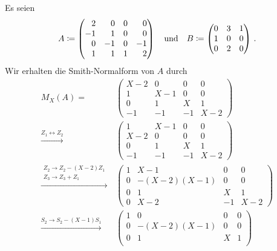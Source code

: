 Es seien
\[
            A
  \defined  \begin{pmatrix*}[r]
               2  &  0  & 0 &  0  \\
              -1  &  1  & 0 &  0  \\
               0  & -1  & 0 & -1  \\
               1  &  1  & 1 &  2
            \end{pmatrix*}
  \quad\text{und}\quad
            B
  \defined  \begin{pmatrix*}[r]
              0 & 3 & 1 \\
              1 & 0 & 0 \\
              0 & 2 & 0
            \end{pmatrix*} \,.
\]
Wir erhalten die Smith-Normalform von $A$ durch
\begin{align*}
    M_X(A)
  =&\,
    \begin{pmatrix}
      X-2 &   0 &   0 &   0 \\
        1 & X-1 &   0 &   0 \\
        0 &   1 & X   &   1 \\
       -1 &  -1 &  -1 & X-2
    \end{pmatrix}
  \\
  \xrightarrow{Z_1 \leftrightarrow Z_2}&\,
    \begin{pmatrix}
        1 & X-1 &   0 &   0 \\
      X-2 &   0 &   0 &   0 \\
        0 &   1 & X   &   1 \\
       -1 &  -1 &  -1 & X-2
    \end{pmatrix}
  \\
  \xrightarrow{\substack{Z_2 \to Z_2 - (X-2) Z_1 \\ Z_3 \to Z_3 + Z_1}}&\,
    \begin{pmatrix}
      1 &         X-1 &   0 &   0 \\
      0 & -(X-2)(X-1) &   0 &   0 \\
      0 &           1 & X   &   1 \\
      0 &         X-2 &  -1 & X-2
    \end{pmatrix}
  \\
  \xrightarrow{S_2 \to S_2 - (X-1) S_1}&\,
    \begin{pmatrix}
      1 &           0 &   0 &   0 \\
      0 & -(X-2)(X-1) &   0 &   0 \\
      0 &           1 & X   &   1 \\

\end{pmatrix}
\end{align*}
